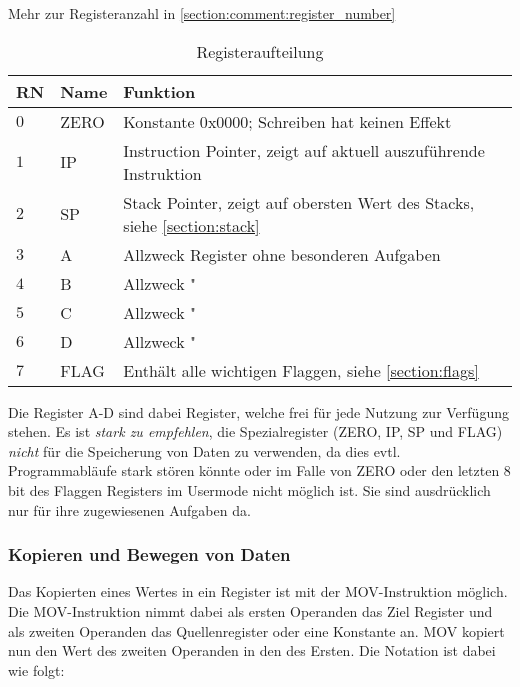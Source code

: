 \documentclass{scrartcl}
\begin{document}
Mehr zur Registeranzahl in \autoref{section:comment:register_number}

\begin{center}
	\begin{table}[h]
		\caption{\label{table:register} Registeraufteilung}
		\begin{tabular}{l | l | l}
			RN & Name & Funktion\\
			\hline
			$0$ & ZERO & Konstante $0\text{x}0000$; Schreiben hat keinen Effekt\\
			$1$ & IP & Instruction Pointer, zeigt auf aktuell auszuführende Instruktion\\
			$2$ & SP & Stack Pointer, zeigt auf obersten Wert des Stacks, siehe \ref{section:stack} \\
			$3$ & A & Allzweck Register ohne besonderen Aufgaben \\
			$4$ & B & Allzweck " \\
			$5$ & C & Allzweck " \\
			$6$ & D & Allzweck " \\
			$7$ & FLAG & Enthält alle wichtigen Flaggen, siehe \autoref{section:flags} \\
		\end{tabular}
	\end{table}
\end{center}

Die Register A-D sind dabei Register, welche frei für jede Nutzung zur Verfügung stehen.
Es ist \emph{stark zu empfehlen}, die Spezialregister (ZERO, IP, SP und FLAG) \emph{nicht} für die Speicherung von Daten zu verwenden, da dies evtl. Programmabläufe stark stören könnte oder im Falle von ZERO oder den letzten 8 bit des Flaggen Registers im Usermode nicht möglich ist.
Sie sind ausdrücklich nur für ihre zugewiesenen Aufgaben da.

\subsubsection{\label{section:DataMov} Kopieren und Bewegen von Daten}

Das Kopierten eines Wertes in ein Register ist mit der MOV-Instruktion möglich.
Die MOV-Instruktion nimmt dabei als ersten Operanden das Ziel Register und als zweiten Operanden das Quellenregister oder eine Konstante an.
MOV kopiert nun den Wert des zweiten Operanden in den des Ersten.
Die Notation ist dabei wie folgt:

\end{document}

